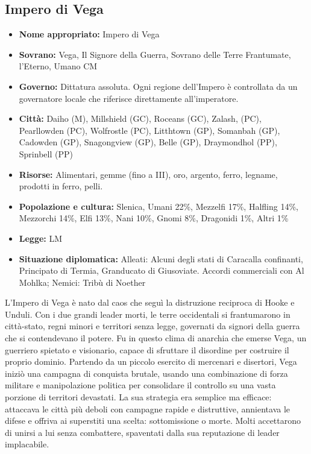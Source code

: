 \documentclass[10pt, a4paper]{report}
\begin{document}
\begin{multicols}{2}
\subsection*{Impero di Vega}
\begin{itemize}
	\item \textbf{Nome appropriato:} Impero di Vega
	\item \textbf{Sovrano:} Vega, Il Signore della Guerra, Sovrano delle Terre Frantumate, l'Eterno, Umano CM
	\item \textbf{Governo:} Dittatura assoluta. Ogni regione dell’Impero è controllata da un governatore locale che riferisce direttamente all'imperatore.
	\item \textbf{Città:} Daiho (M), Millshield (GC), Roceans (GC), Zalash, (PC), Pearllowden (PC), Wolfrostle (PC), Litthtown (GP), Somanbah (GP), Cadowden (GP), Snagongview (GP), Belle (GP), Draymondhol (PP), Sprinbell (PP)
	\item \textbf{Risorse:} Alimentari, gemme (fino a III), oro, argento, ferro, legname, prodotti in ferro, pelli.
	\item \textbf{Popolazione e cultura:} Slenica, Umani 22\%, Mezzelfi 17\%, Halfling 14\%, Mezzorchi 14\%, Elfi 13\%, Nani 10\%, Gnomi 8\%, Dragonidi 1\%, Altri 1\%
	\item \textbf{Legge:} LM
	\item \textbf{Situazione diplomatica:} Alleati: Alcuni degli stati di Caracalla confinanti, Principato di Termia, Granducato di Giusoviate. Accordi commerciali con Al Mohlka; Nemici: Tribù di Noether	
\end{itemize}
L’Impero di Vega è nato dal caos che seguì la distruzione reciproca di Hooke e Unduli. Con i due grandi leader morti, le terre occidentali si frantumarono in città-stato, regni minori e territori senza legge, governati da signori della guerra che si contendevano il potere. Fu in questo clima di anarchia che emerse Vega, un guerriero spietato e visionario, capace di sfruttare il disordine per costruire il proprio dominio. Partendo da un piccolo esercito di mercenari e disertori, Vega iniziò una campagna di conquista brutale, usando una combinazione di forza militare e manipolazione politica per consolidare il controllo su una vasta porzione di territori devastati. La sua strategia era semplice ma efficace: attaccava le città più deboli con campagne rapide e distruttive, annientava le difese e offriva ai superstiti una scelta: sottomissione o morte. Molti accettarono di unirsi a lui senza combattere, spaventati dalla sua reputazione di leader implacabile.

\end{multicols}
\end{document}
